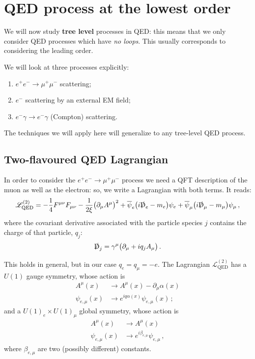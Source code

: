 \documentclass[main.tex]{subfiles}
\begin{document}
\section{QED process at the lowest order}


We will now study \textbf{tree level} processes in QED: this means that we only consider QED processes which have \emph{no loops}.
This usually corresponds to considering the leading order. 

We will look at three processes explicitly: 
\begin{enumerate}
    \item \(e^{+} e^{-} \to \mu^+ \mu^-\) scattering;
    \item \(e^{-}\) scattering by an external EM field;
    \item \(e^{-} \gamma \to e^{-} \gamma \) (Compton) scattering.
\end{enumerate}

The techniques we will apply here will generalize to any tree-level QED process. 

\subsection{Two-flavoured QED Lagrangian}

In order to consider the \(e^{+} e^{-} \to \mu^+ \mu^-\) process we need a QFT description of the muon as well as the electron: so, we write a Lagrangian with both terms. It reads: 
%
\begin{align}
\mathscr{L}^{(2)}_{\text{QED}} = - \frac{1}{4} F^{\mu \nu } F_{\mu \nu }
- \frac{1}{2 \xi } \qty(\partial_{\mu } A^{\mu })^2
+ \overline{\psi}_{e} \qty(i \slashed{\mathrm{D}}_e - m_e) \psi_{e}
+ \overline{\psi}_{\mu} \qty(i \slashed{\mathrm{D}}_\mu - m_\mu) \psi_{\mu}
\,,
\end{align}
%
where the covariant derivative associated with the particle species \(j\) contains the charge of that particle, \(q_j\):
%
\begin{align}
\slashed{\mathrm{D}}_j = \gamma^{\mu } \qty(\partial_{\mu } + i q_j A_{\mu })
\,.
\end{align}

This holds in general, but in our case \(q_e = q_\mu = -e\). 
The Lagrangian \(\mathscr{L}^{(2)} _{\text{QED}}\) has a \(U(1)\) gauge symmetry, whose action is 
%
\begin{align}
A^{\mu }(x) & \to A^{\mu }(x ) - \partial_{\mu } \alpha (x)  \\
\psi_{e, \mu }(x) & \to e^{iq \alpha (x)} \psi_{e, \mu }(x)
\,;
\end{align}
%
and a \(U(1)_{e} \times U(1)_{\mu }\) global symmetry, whose action is 
%
\begin{align}
A^{\mu }(x) &\to A^{\mu }(x)  \\
\psi_{e, \mu } (x ) & \to e^{i \beta_{{e, \mu }}} \psi_{e, \mu }
\,,
\end{align}
%
where \(\beta_{e, \mu }\) are two (possibly different) constants. 
\end{document}
